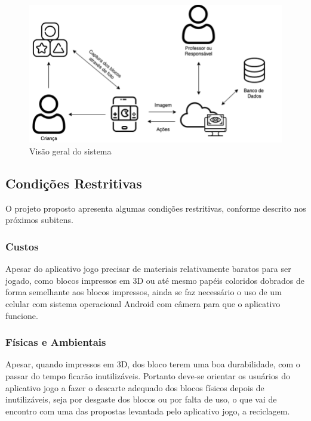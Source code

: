     \begin{figure}[H]
        \caption{Visão geral do sistema}
        \begin{center}
            \includegraphics[width=\linewidth]{Imagens/cap3/diagrama_blocos.png}
        \end{center}
        \label{figura:diagrama_blocos}
    \end{figure}
    
    \subsection{Condições Restritivas}
    O projeto proposto apresenta algumas condições restritivas, conforme descrito
    nos próximos subitens.

        \subsubsection{Custos}
        Apesar do aplicativo jogo precisar de materiais relativamente baratos para ser jogado, como blocos impressos em 3D ou até mesmo papéis coloridos dobrados de forma semelhante aos blocos impressos, ainda se faz necessário o uso de um celular com sistema operacional Android com câmera para que o aplicativo funcione. 
            
        \subsubsection{Físicas e Ambientais}
        Apesar, quando impressos em 3D, dos bloco terem uma boa durabilidade, com o passar do tempo ficarão inutilizáveis. Portanto deve-se orientar os usuários do aplicativo jogo a fazer o descarte adequado dos blocos físicos depois de inutilizáveis, seja por desgaste dos blocos ou por falta de uso, o que vai de encontro com uma das propostas levantada pelo aplicativo jogo, a reciclagem.
        
